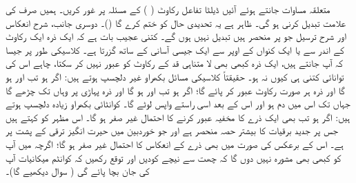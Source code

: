 متعلقہ مساوات جانتے ہوئے  آئیں ڈیلٹا تفاعل  رکاوٹ ( ) کے مسئلہ پر غور کریں۔ ہمیں صرف   کی علامت تبدیل کرنی   ہو گی۔ ظاہر ہے یہ تحدیدی حال کو ختم کرے گا  ()۔  دوسری جانب،   شرح  انعکاس اور شرح  ترسیل جو  پر منحصر  ہیں تبدیل نہیں ہوں گے۔ کتنی عجیب بات ہے کہ ایک ذرہ ایک رکاوٹ کے اندر سے یا ایک کنواں  کے اوپر سے ایک  جیسی  آسانی کے ساتھ گزرتا ہے۔   کلاسیکی طور پر جیسا کہ آپ جانتے ہیں،  ایک ذرہ کبھی بھی لا متناہی  قد کے رکاوٹ کو عبور نہیں کر سکتا،  چاہے اس کی توانائی کتنی ہی کیوں نہ ہو۔    حقیقتاً  کلاسیکی مسائل بکھراو  غیر دلچسپ ہوتے ہیں:  اگر   ہو تب  اور  ہو گا اور ذرہ ہر صورت رکاوٹ عبور کر پائے گا؛  اگر    ہو تب   اور  ہو گا اور ذرہ  پہاڑی پر وہاں تک چڑھے گا جہاں تک اس میں دم ہو  اور اس  کے بعد اسی راستے واپس لوٹے گا۔  کوانٹائی بکھراو  زیادہ دلچسپ ہوتے ہیں:    اگر    ہو تب بھی ایک  ذرے کا مخفیہ  عبور کرنے کا احتمال غیر صفر ہو گا۔ اس مظہر کو    کہتے ہیں جس پر جدید برقیات کا بیشتر حصہ منحصر ہے اور جو خوردبین میں حیرت انگیز  ترقی کے پشت پر ہے۔  اس کے برعکس   کی صورت میں  بھی ذرے کے انعکاس کا احتمال  غیر صفر   ہو گا؛  اگرچہ میں آپ کو کبھی بھی مشورہ نہیں دوں گا کہ چھت سے نیچے کودیں اور توقع رکھیں کہ کوانٹم میکانیات آپ کی جان بچا  پائے  گی ( سوال  دیکھیے گا)۔
 
